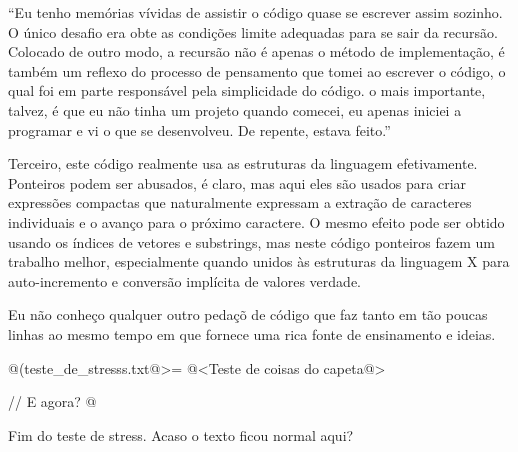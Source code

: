 ``Eu tenho memórias vívidas de assistir o código quase se escrever
assim sozinho. O único desafio era obte as condições limite adequadas
para se sair da recursão. Colocado de outro modo, a recursão não é
apenas o método de implementação, é também um reflexo do processo de
pensamento que tomei ao escrever o código, o qual foi em parte
responsável pela simplicidade do código. o mais importante, talvez, é
que eu não tinha um projeto quando comecei, eu apenas iniciei a
programar e vi o que se desenvolveu. De repente, estava feito.''

Terceiro, este código realmente usa as estruturas da linguagem
efetivamente. Ponteiros podem ser abusados, é claro, mas aqui eles são
usados para criar expressões compactas que naturalmente expressam a
extração de caracteres individuais e o avanço para o próximo
caractere. O mesmo efeito pode ser obtido usando os índices de vetores
e substrings, mas neste código ponteiros fazem um trabalho melhor,
especialmente quando unidos às estruturas da linguagem X para
auto-incremento e conversão implícita de valores verdade.

Eu não conheço qualquer outro pedaçõ de código que faz tanto em tão
poucas linhas ao mesmo tempo em que fornece uma rica fonte de
ensinamento e ideias.

@(teste_de_stresss.txt@>=
@<Teste de coisas do capeta@>

// E agora?
@

Fim do teste de stress. Acaso o texto ficou normal aqui?

\fim
